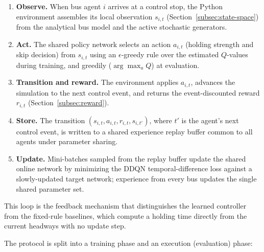 \begin{enumerate}
\item \textbf{Observe.} When bus agent $i$ arrives at a control stop, the Python environment assembles its local observation $s_{i,t}$ (Section~\ref{subsec:state-space}) from the analytical bus model and the active stochastic generators.
\item \textbf{Act.} The shared policy network selects an action $a_{i,t}$ (holding strength and skip decision) from $s_{i,t}$ using an $\epsilon$-greedy rule over the estimated $Q$-values during training, and greedily ($\arg\max_a Q$) at evaluation.
\item \textbf{Transition and reward.} The environment applies $a_{i,t}$, advances the simulation to the next control event, and returns the event-discounted reward $r_{i,t}$ (Section~\ref{subsec:reward}).
\item \textbf{Store.} The transition $(s_{i,t}, a_{i,t}, r_{i,t}, s_{i,t'})$, where $t'$ is the agent's next control event, is written to a shared experience replay buffer common to all agents under parameter sharing.
\item \textbf{Update.} Mini-batches sampled from the replay buffer update the shared online network by minimizing the DDQN temporal-difference loss against a slowly-updated target network; experience from every bus updates the single shared parameter set.
\end{enumerate}

This loop is the feedback mechanism that distinguishes the learned controller from the fixed-rule baselines, which compute a holding time directly from the current headways with no update step.

The protocol is split into a training phase and an execution (evaluation) phase:


